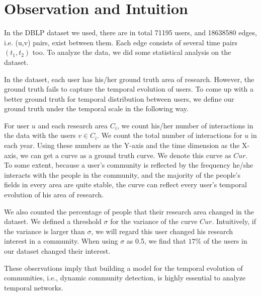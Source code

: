 \section{Observation and Intuition}
\label{sec:intuition}
In the DBLP dataset we used, there are in total 71195 users, and 18638580 edges, i.e. (u,v) pairs,  exist between them. Each edge consists of several time pairs $(t_1,t_2)$ too. To analyze the data, we did some statistical analysis on the dataset. 

In the dataset, each user has his/her ground truth area of research. However, the ground truth fails to capture the temporal evolution of users. To come up with a better ground truth for temporal distribution between users, we define our ground truth under the temporal scale in the following way. 

For user $u$ and each research area $C_i$, we count his/her number of interactions in the data with the users $v\in C_i$. We count the total number of interactions for $u$ in each year. Using these numbers as the Y-axis and the time dimension as the X-axis, we can get a curve as a ground truth curve. We denote this curve as $Cur$. To some extent, because a user's community is reflected by the frequency he/she interacts with the people in the community, and the majority of the people's fields in every area are quite stable, the curve can reflect every user's temporal evolution of his area of research. 

We also counted the percentage of people that their research area changed in the dataset. We defined a threshold $\sigma$ for the variance of the curve $Cur$. Intuitively, if the variance is larger than $\sigma$, we will regard this user changed his research interest in a community. When using $\sigma $ as 0.5, we find that $17\%$ of the users in our dataset changed their interest. 

These observations imply that building a model for the temporal evolution of communities, i.e., dynamic community detection, is highly essential to analyze temporal networks.

